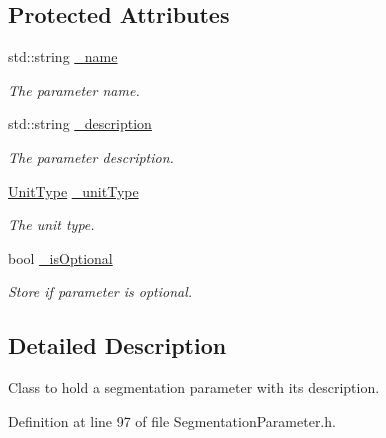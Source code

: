 \subsection*{Protected Attributes}
\begin{DoxyCompactItemize}
\item 
std::string \hyperlink{class_d_d4hep_1_1_d_d_segmentation_1_1_segmentation_parameter_a3d95d4b4814b3a5e1f15a432ca6526b1}{\_\-name}
\begin{DoxyCompactList}\small\item\em The parameter name. \item\end{DoxyCompactList}\item 
std::string \hyperlink{class_d_d4hep_1_1_d_d_segmentation_1_1_segmentation_parameter_a1b798aa8deadc4d66205109cbe6bc120}{\_\-description}
\begin{DoxyCompactList}\small\item\em The parameter description. \item\end{DoxyCompactList}\item 
\hyperlink{class_d_d4hep_1_1_d_d_segmentation_1_1_segmentation_parameter_a36f5f8b8d812b2a2b81363377565d8d4}{UnitType} \hyperlink{class_d_d4hep_1_1_d_d_segmentation_1_1_segmentation_parameter_a1f5990f9669bf3265f6253f1f9a03e2a}{\_\-unitType}
\begin{DoxyCompactList}\small\item\em The unit type. \item\end{DoxyCompactList}\item 
bool \hyperlink{class_d_d4hep_1_1_d_d_segmentation_1_1_segmentation_parameter_a0dfb17241c0a1ed7f6a54c13ec6c9adb}{\_\-isOptional}
\begin{DoxyCompactList}\small\item\em Store if parameter is optional. \item\end{DoxyCompactList}\end{DoxyCompactItemize}


\subsection{Detailed Description}
Class to hold a segmentation parameter with its description. 

Definition at line 97 of file SegmentationParameter.h.

